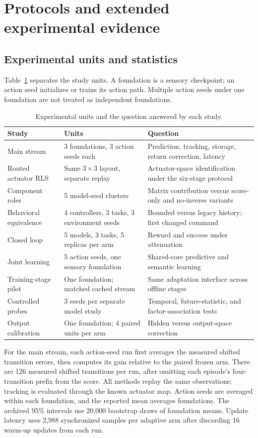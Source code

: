 \section{Protocols and extended experimental evidence}
\label{app:extended}
\subsection{Experimental units and statistics}
\label{app:protocols}
Table~\ref{tab:studies} separates the study units. A foundation is a sensory
checkpoint; an action seed initializes or trains its action path. Multiple
action seeds under one foundation are not treated as independent foundations.
\begin{table}[tbp]\centering\small
\caption{Experimental units and the question answered by each study.}
\label{tab:studies}
\begin{tabular}{@{}p{.24\linewidth}p{.31\linewidth}p{.39\linewidth}@{}}\toprule
Study & Units & Question\\\midrule
Main stream & 3 foundations, 3 action seeds each & Prediction, tracking, storage, return correction, latency\\
Routed actuator RLS & Same $3\times3$ layout, separate replay & Actuator-space identification under the six-stage protocol\\
Component roles & 5 model-seed clusters & Matrix contribution versus score-only and no-inverse variants\\
Behavioral equivalence & 4 controllers, 3 tasks, 3 environment seeds & Bounded versus legacy history; first changed command\\
Closed loop & 5 models, 3 tasks, 5 replicas per arm & Reward and success under attenuation\\
Joint learning & 5 action seeds, one sensory foundation & Shared-core predictive and semantic learning\\
Training-stage pilot & One foundation; matched cached stream & Same adaptation interface across offline stages\\
Controlled probes & 3 seeds per separate model study & Temporal, future-statistic, and factor-association tests\\
Output calibration & One foundation; 4 paired units per arm & Hidden versus output-space correction\\\bottomrule
\end{tabular}\end{table}

For the main stream, each action-seed run first averages the measured shifted
transition errors, then computes its gain relative to the paired frozen arm.
There are 126 measured shifted transitions per run, after omitting each
episode's four-transition prefix from the score. All methods replay the same
observations; tracking is evaluated through the known actuator map.
Action seeds are averaged within each foundation, and the reported mean
averages foundations. The archived 95\% intervals use 20,000 bootstrap draws
of foundation means. Update latency uses 2,988 synchronized samples per
adaptive arm after discarding 16 warm-up updates from each run.


